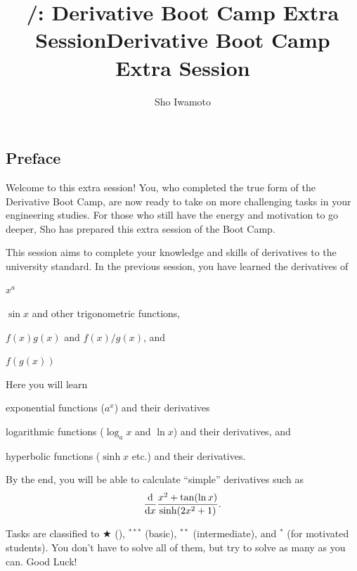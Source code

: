 \documentclass[11pt,pdfa,lastpage]{MishoNote}
\title{\LectureName/: Derivative Boot Camp Extra Session}
\author{Sho Iwamoto}
\let\origfootnote\footnote
\let\origfootnoterule\footnoterule
\begin{document}
%
\title{Derivative Boot Camp Extra Session}\begin{maketitle}
\let\footnote\origfootnote
\let\footnoterule\origfootnoterule

\subsection*{Preface}
Welcome to this extra session!
You, who completed the true form of the Derivative Boot Camp, are now ready to take on more challenging tasks in your engineering studies.
For those who still have the energy and motivation to go deeper, Sho has prepared this extra session of the Boot Camp.

This session aims to complete your knowledge and skills of derivatives to the university standard.
In the previous session, you have learned the derivatives of
\begin{miniitemize}
  \item $x^a$
  \item $\sin x$ and other trigonometric functions,
  \item $f(x)g(x)$ and $f(x)/g(x)$, and
  \item $f(g(x))$
\end{miniitemize}
Here you will learn
\begin{miniitemize}
  \item exponential functions ($a^x$) and their derivatives
  \item logarithmic functions ($\log_a x$ and $\ln x$) and their derivatives, and
  \item hyperbolic functions ($\sinh x$ etc.) and their derivatives.
\end{miniitemize}
By the end, you will be able to calculate ``simple'' derivatives such as
\[
\diff{}{x}\frac{x^2+\tan(\ln x)}{\sinh(2x^2+1)}.
\]

Tasks are classified to $\bigstar$ (), $^{***}$ (basic), $^{**}$ (intermediate), and $^{*}$ (for motivated students).
You don't have to solve all of them, but try to solve as many as you can.
Good Luck!

\enlargethispage{-5em}


\end{maketitle}
\end{document}
